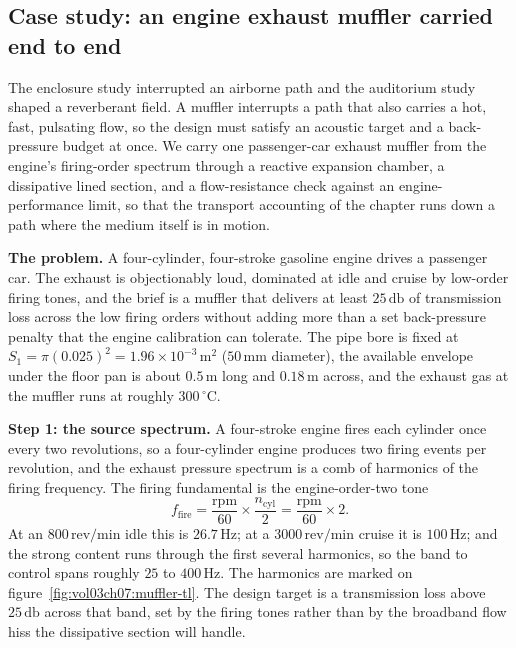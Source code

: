 



\subsection{Case study: an engine exhaust muffler carried end to end}

The enclosure study interrupted an airborne path and the auditorium study
shaped a reverberant field. A muffler interrupts a path that also carries a
hot, fast, pulsating flow, so the design must satisfy an acoustic target
and a back-pressure budget at once. We carry one passenger-car exhaust
muffler from the engine's firing-order spectrum through a reactive
expansion chamber, a dissipative lined section, and a flow-resistance check
against an engine-performance limit, so that the transport accounting of
the chapter runs down a path where the medium itself is in motion.

\textbf{The problem.} A four-cylinder, four-stroke gasoline engine drives a
passenger car. The exhaust is objectionably loud, dominated at idle and
cruise by low-order firing tones, and the brief is a muffler that delivers
at least $25\,\si{\decibel}$ of transmission loss across the low firing
orders without adding more than a set back-pressure penalty that the engine
calibration can tolerate. The pipe bore is fixed at
$S_1 = \pi(0.025)^2 = 1.96\times 10^{-3}\,\si{\meter\squared}$
($50\,\si{\milli\meter}$ diameter), the available envelope under the floor
pan is about $0.5\,\si{\meter}$ long and $0.18\,\si{\meter}$ across, and
the exhaust gas at the muffler runs at roughly $300\,{}^{\circ}\mathrm{C}$.

\textbf{Step 1: the source spectrum.} A four-stroke engine fires each
cylinder once every two revolutions, so a four-cylinder engine produces two
firing events per revolution, and the exhaust pressure spectrum is a comb
of harmonics of the firing frequency. The firing fundamental is the
engine-order-two tone
\[
f_{\text{fire}} = \frac{\text{rpm}}{60}\times \frac{n_{\text{cyl}}}{2}
                = \frac{\text{rpm}}{60}\times 2 .
\]
At an $800\,\text{rev/min}$ idle this is $26.7\,\si{\hertz}$; at a
$3000\,\text{rev/min}$ cruise it is $100\,\si{\hertz}$; and the strong
content runs through the first several harmonics, so the band to control
spans roughly $25$ to $400\,\si{\hertz}$. The harmonics are marked on
figure~\ref{fig:vol03ch07:muffler-tl}. The design target is a transmission
loss above $25\,\si{\decibel}$ across that band, set by the firing tones
rather than by the broadband flow hiss the dissipative section will handle.

